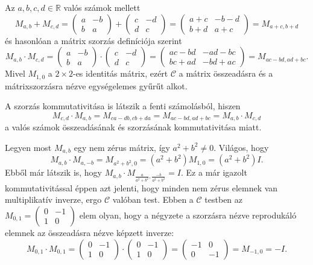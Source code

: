 \documentclass[a4paper, showtrims]{memoir}
\makeatletter
\renewenvironment{proof}[1][\proofname]
    {\par\pushQED{\qed}%
    \normalfont \topsep6\p@\@plus6\p@\relax
    \trivlist
    \item[\hskip\labelsep
        \itshape
    #1\@addpunct{:}]\ignorespaces}
    {\popQED\endtrivlist\@endpefalse}
\theoremstyle{plain}
\theoremstyle{remark}
\theoremstyle{definition}
\makeatother
\begin{document}
\begin{proof}
	Az $a,b,c,d\in\mathbb{R}$ valós számok mellett
	\[
		M_{a,b}+M_{c,d}=
		\begin{pmatrix}
			a & -b \\
			b & a
		\end{pmatrix}
		+
		\begin{pmatrix}
			c & -d \\
			d & c
		\end{pmatrix}
		=
		\begin{pmatrix}
			a+c & -b-d \\
			b+d & a+c
		\end{pmatrix}
		=
		M_{a+c,b+d}
	\]
	és hasonlóan a mátrix szorzás definíciója szerint
	\[
		M_{a,b}\cdot M_{c,d}=
		\begin{pmatrix}
			a & -b \\
			b & a
		\end{pmatrix}
		\cdot
		\begin{pmatrix}
			c & -d \\
			d & c
		\end{pmatrix}
		=
		\begin{pmatrix}
			ac-bd & -ad-bc \\
			bc+ad & -bd+ac
		\end{pmatrix}
		=
		M_{ac-bd,ad+bc}.
	\]
	Mivel $M_{1,0}$ a $2\times 2$-es identitás mátrix, ezért $\mathcal{C}$ a mátrix összeadásra és a mátrixszorzásra nézve
	egységelemes gyűrűt alkot.

	A szorzás kommutativitása is látszik a fenti számolásból, hiszen
	\[
		M_{c,d}\cdot M_{a,b}=M_{ca-db,cb+da}=M_{ac-bd,ad+bc}=M_{a,b}\cdot M_{c,d}
	\]
	a valós számok összeadásának és szorzásának
	kommutativitása miatt.

	Legyen most $M_{a,b}$ egy nem zérus mátrix, így $a^2+b^2\neq 0$.
	Világos, hogy
	\[
		M_{a,b}\cdot M_{a,-b}=M_{a^2+b^2,0}=\left( a^2+b^2 \right)M_{1,0}=\left( a^2+b^2 \right)I.
	\]
	Ebből már látszik is, hogy $M_{a,b}\cdot M_{\frac{a}{a^2+b^2},\frac{-b}{a^2+b^2}}=I$.
	Ez a már igazolt kommutativitással éppen azt jelenti, hogy minden nem zérus elemnek van multiplikatív inverze,
	ergo $\mathcal{C}$ valóban test.
\end{proof}
Ebben a $\mathcal{C}$ testben az
\(
M_{0,1}=
\begin{pmatrix}
	0 & -1 \\
	1 & 0
\end{pmatrix}
\)
elem olyan, hogy a négyzete a szorzásra nézve reprodukáló elemnek az összeadásra nézve képzett inverze:
\[
	M_{0,1}\cdot M_{0,1}
	=
	\begin{pmatrix}
		0 & -1 \\
		1 & 0
	\end{pmatrix}
	\cdot
	\begin{pmatrix}
		0 & -1 \\
		1 & 0
	\end{pmatrix}
	=
	\begin{pmatrix}
		-1 & 0  \\
		0  & -1
	\end{pmatrix}
	=
	M_{-1,0}
	=
	-I.
\]
\end{document}

